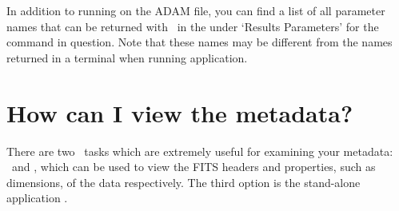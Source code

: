 \documentclass[11pt,oneside,chapters]{starlink}
\begin{document}
In addition to running  on the ADAM file, you can find
a list of all parameter names that can be returned with \parget\ in
the  under `Results Parameters'
for the command in question. Note that these names may be different
from the names returned in a terminal when running application.

\section{How can I view the metadata?}
\label{sec:fitslist}

There are two \Kappa\ tasks which are extremely useful for examining
your metadata: \fitslist\ and \ndftrace, which can be used to view the
FITS headers and properties, such as dimensions, of the data
respectively. The third option is the stand-alone application
\HDSTRACE.
\vspace{0.7cm}\\
\end{document}
